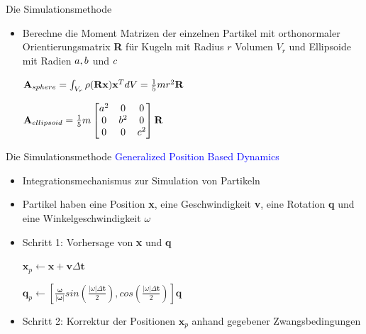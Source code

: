 \documentclass[t]{beamer}
\begin{document}
	\begin{frame}{Die Simulationsmethode}
		\begin{itemize}
			\item Berechne die Moment Matrizen der einzelnen Partikel mit orthonormaler Orientierungsmatrix \textbf{R} für Kugeln mit Radius $r$ Volumen $V_r$ und Ellipsoide mit Radien $\mathnormal{a, b}$ und $\mathnormal{c}$ 
					\begin{center}
						$\mathnormal{\mathbf{A}_{sphere}}= \int_{V_r}\rho(\mathbf{Rx})\mathbf{x}^T dV = \frac{1}{5}mr^2\mathbf{R}$
					\end{center}
					\begin{center}	
						$\mathnormal{\mathbf{A}_{ellipsoid}}= \frac{1}{5}m
						\begin{bmatrix}
						a^2& 0& 0 \\
						0& b^2& 0 \\
						0& 0& c^2
						\end{bmatrix}\mathbf{R}$
					\end{center}
		\end{itemize}
	\end{frame}
	
	\begin{frame}{Die Simulationsmethode}
		\textcolor{blue}{Generalized Position Based Dynamics}
		\begin{itemize}
			\item Integrationsmechanismus zur Simulation von Partikeln
			\item Partikel haben eine Position \textbf{x}, eine Geschwindigkeit \textbf{v}, eine Rotation \textbf{q} und eine Winkelgeschwindigkeit $\omega$
			\item Schritt 1: Vorhersage von \textbf{x} und \textbf{q}
					\begin{center}
						$\mathbf{x}_p \leftarrow \mathbf{x}+\mathbf{v}\Delta \mathbf{t}$
					\end{center}
					\begin{center}
						$\mathbf{q}_p \leftarrow [\frac{\mathbf{\omega}}{\vert \mathbf{\omega \vert}} sin(\frac{\vert \omega \vert \Delta \mathbf{t}}{2}), cos(\frac{\vert \omega \vert \Delta \mathbf{t}}{2})]\mathbf{q}$
					\end{center}
			\item Schritt 2: Korrektur der Positionen $\mathbf{x}_p$ anhand gegebener Zwangsbedingungen
		\end{itemize}
	\end{frame}
	
\end{document}
